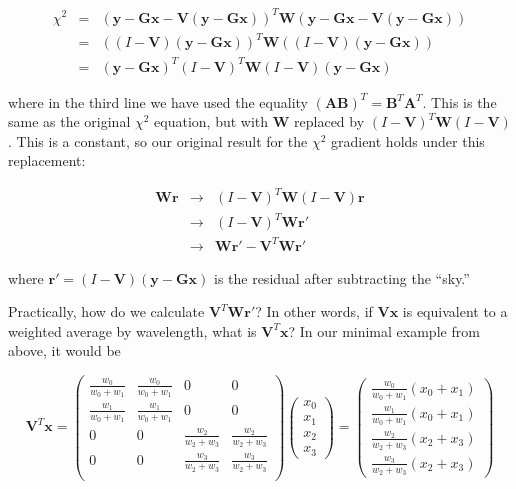 \documentclass[12pt]{article}
\newcommand{\G}{\mathbf{G}}
\newcommand{\x}{\mathbf{x}}
\newcommand{\y}{\mathbf{y}}
\newcommand{\rvect}{\mathbf{r}}
\newcommand{\W}{\mathbf{W}}
\newcommand{\V}{\mathbf{V}}
\begin{document}
\begin{eqnarray*}
\chi^2 &=& (\y - \G\x - \V(\y - \G\x))^T \W (\y - \G\x - \V(\y - \G\x)) \\
       &=& ((I - \V)(\y - \G\x))^T \W ((I - \V)(\y - \G\x)) \\
       &=& (\y - \G\x)^T (I - \V)^T \W (I - \V) (\y - \G\x)
\end{eqnarray*}

\noindent where in the third line we have used the equality
$(\mathbf{A}\mathbf{B})^T = \mathbf{B}^T \mathbf{A}^T$. This is the
same as the original $\chi^2$ equation, but with $\W$ replaced by $(I
- \V)^T \W (I - \V)$. This is a constant, so our original result for the
$\chi^2$ gradient holds under this replacement:

\begin{eqnarray*}
\W \rvect &\to& (I - \V)^T \W (I - \V) \rvect \\
          &\to& (I - \V)^T \W \mathbf{r'} \\
          &\to& \W \mathbf{r'} - \V^T \W \mathbf{r'}
\end{eqnarray*}

\noindent where $\mathbf{r'} = (I - \V)(\y - \G\x)$ is the residual after
subtracting the ``sky.''

Practically, how do we calculate $\V^T \W \mathbf{r'}$? In other words, if
$\V \x$ is equivalent to a weighted average by wavelength, what is $\V^T \x$?
In our minimal example from above, it would be

\begin{equation}
  \V^T \x
  = \left( \begin{array}{cccc}
    \frac{w_0}{w_0 + w_1} & \frac{w_0}{w_0 + w_1} & 0 & 0 \\
    \frac{w_1}{w_0 + w_1} & \frac{w_1}{w_0 + w_1} & 0 & 0 \\
    0   & 0   & \frac{w_2}{w_2 + w_3} & \frac{w_2}{w_2 + w_3} \\
    0   & 0   & \frac{w_3}{w_2 + w_3} & \frac{w_3}{w_2 + w_3} \\
    \end{array} \right)
    \left( \begin{array}{c} x_0 \\ x_1 \\ x_2 \\ x_3 \end{array} \right)
  = \left( \begin{array}{c}
    \frac{w_0}{w_0 + w_1} (x_0 + x_1) \\
    \frac{w_1}{w_0 + w_1} (x_0 + x_1) \\
    \frac{w_2}{w_2 + w_3} (x_2 + x_3) \\
    \frac{w_3}{w_2 + w_3} (x_2 + x_3)
    \end{array} \right)
\end{equation}
\end{document}
